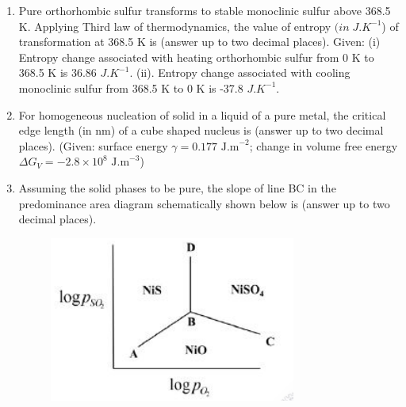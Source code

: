 \documentclass[journal]{IEEEtran}
\theoremstyle{remark}
\begin{document}
\begin{enumerate}
\item Pure orthorhombic sulfur transforms to stable monoclinic sulfur above 368.5 K. Applying Third law of thermodynamics, the value of entropy $(in\; J.K^{-1}$) of transformation at 368.5 K is \underline {\hspace{2cm}} (answer up to two decimal places). Given: (i) Entropy change associated with heating orthorhombic sulfur from 0 K to 368.5 K is 36.86 $J.K^{-1}$. (ii). Entropy change associated with cooling monoclinic sulfur from 368.5 K to 0 K is -37.8 $J.K^{-1}$. \hfill{}

\item For homogeneous nucleation of solid in a liquid of a pure metal, the critical edge length (in nm) of a cube shaped nucleus is \underline {\hspace{2cm}} (answer up to two decimal places). (Given: surface energy $\gamma=0.177\text{ J.m}^{-2}$; change in volume free energy $\Delta G_V = -2.8 \times 10^8 \text{ J.m}^{-3}$) \hfill{}

\item Assuming the solid phases to be pure, the slope of line BC in the predominance area diagram schematically shown below is \underline {\hspace{2cm}} (answer up to two decimal places).
\begin{figure}[H]
    \centering
    \includegraphics[width=0.4\columnwidth]{figs/Q.44.png}
    \caption{}
    \label{fig:placeholder}
\end{figure}
\hfill{}


\end{enumerate}
\end{document}
